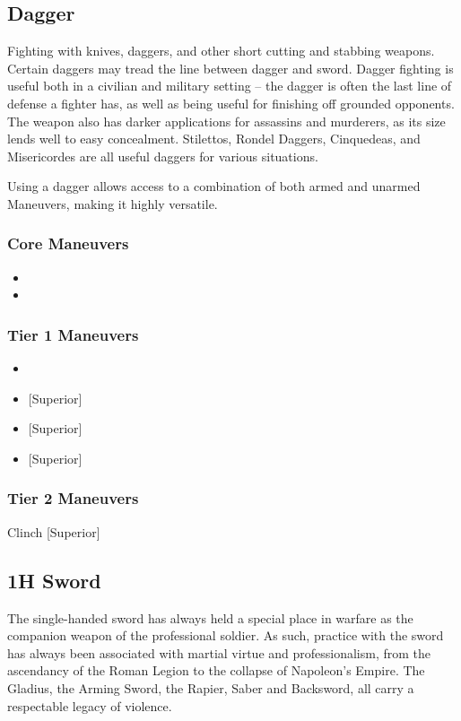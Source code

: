 \documentclass[oneside,11pt,english]{book}
\begin{document}
\subsection{Dagger}
Fighting with knives, daggers, and other short cutting and stabbing weapons. Certain daggers may tread 
the line between dagger and sword. Dagger fighting is useful both in a civilian and military setting -- the 
dagger is often the last line of defense a fighter has, as well as being useful for finishing off grounded 
opponents. The weapon also has darker applications for assassins and murderers, as its size lends well to 
easy concealment. Stilettos, Rondel Daggers, Cinquedeas, and Misericordes are all useful daggers for various situations.

Using a dagger allows access to a combination of both armed and unarmed Maneuvers, making it highly 
versatile. 

\subsubsection{Core Maneuvers}
\vspace{-5pt}\begin{itemize}
  [itemsep=0.5mm]
\item {}
\item {}
\end{itemize}

\subsubsection{Tier 1 Maneuvers}
\vspace{-5pt}\begin{itemize}
  [itemsep=0.5mm]
\item {}
\item {} [Superior]
\item {} [Superior]
\item {} [Superior]
\end{itemize}
\subsubsection{Tier 2 Maneuvers}
Clinch [Superior]

\subsection{1H Sword}
The single-handed sword has always held a special place in warfare as the companion weapon of the 
professional soldier. As such, practice with the sword has always been associated with martial virtue and 
professionalism, from the ascendancy of the Roman Legion to the collapse of Napoleon’s Empire. The 
Gladius, the Arming Sword, the Rapier, Saber and Backsword, all carry a respectable legacy of violence. 
\end{document}
